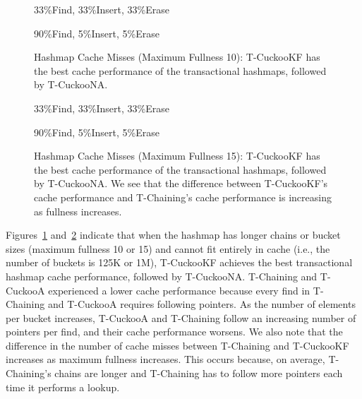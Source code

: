    \begin{figure}[H]
    \centering
        \begin{minipage}{0.75\textwidth}
        \centering
            \caption*{33\%Find, 33\%Insert, 33\%Erase}
            \vspace{12pt}
        \end{minipage}
        \begin{minipage}{0.75\textwidth}
            \centering
            \caption*{90\%Find, 5\%Insert, 5\%Erase}
        \end{minipage}
        \caption[Hashmap Cache Misses (Maximum Fullness 10)]{Hashmap Cache Misses (Maximum Fullness 10): T-CuckooKF has the best cache performance of the transactional hashmaps, followed by T-CuckooNA.}
		\label{fig:hm_cm10}
    \end{figure}

    \begin{figure}[H]
    \centering
        \begin{minipage}{0.75\textwidth}
        \centering
            \caption*{33\%Find, 33\%Insert, 33\%Erase}
            \vspace{12pt}
        \end{minipage}
        \begin{minipage}{0.75\textwidth}
            \centering
            \caption*{90\%Find, 5\%Insert, 5\%Erase}
        \end{minipage}
        \caption[Hashmap Cache Misses (Maximum Fullness 15)]{Hashmap Cache Misses (Maximum Fullness 15): T-CuckooKF has the best cache performance of the transactional hashmaps, followed by T-CuckooNA. We see that the difference between T-CuckooKF's cache performance and T-Chaining's cache performance is increasing as fullness increases.}
		\label{fig:hm_cm15}
    \end{figure}

Figures~\ref{fig:hm_cm10} and~\ref{fig:hm_cm15} indicate that when the hashmap has longer chains or bucket sizes (maximum fullness 10 or 15) and cannot fit entirely in cache (i.e., the number of buckets is 125K or 1M), T-CuckooKF achieves the best transactional hashmap cache performance, followed by T-CuckooNA. 
T-Chaining and T-CuckooA experienced a lower cache performance because every find in T-Chaining and T-CuckooA requires following pointers. As the number of elements per bucket increases, T-CuckooA and T-Chaining follow an increasing number of pointers per find, and their cache performance worsens.
We also note that the difference in the number of cache misses between T-Chaining and T-CuckooKF increases as maximum fullness increases. This occurs because, on average, T-Chaining's chains are longer and T-Chaining has to follow more pointers each time it performs a lookup. 

